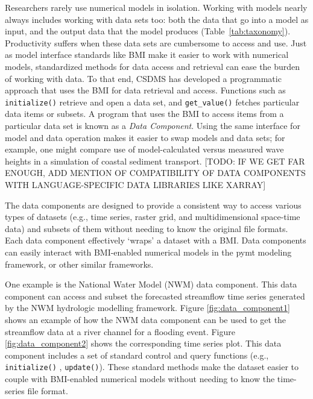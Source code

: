 \documentclass[12pt]{amsart}
\begin{document}
Researchers rarely use numerical models in isolation. Working with models nearly always includes working with data sets too: both the data that go into a model as input, and the output data that the model produces (Table~\ref{tab:taxonomy}). Productivity suffers when these data sets are cumbersome to access and use. Just as model interface standards like BMI make it easier to work with numerical models, standardized methods for data access and retrieval can ease the burden of working with data. To that end, CSDMS has developed a programmatic approach that uses the BMI for data retrieval and access. Functions such as \texttt{initialize()} retrieve and open a data set, and \texttt{get\_value()} fetches particular data items or subsets. A program that uses the BMI to access items from a particular data set is known as a \textit{Data Component}. Using the same interface for model and data operation makes it easier to swap models and data sets; for example, one might compare use of model-calculated versus measured wave heights in a simulation of coastal sediment transport. [TODO: IF WE GET FAR ENOUGH, ADD MENTION OF COMPATIBILITY OF DATA COMPONENTS WITH LANGUAGE-SPECIFIC DATA LIBRARIES LIKE XARRAY]

The data components are designed to provide a consistent way to access various types of datasets (e.g., time series, raster grid, and multidimensional space-time data) and subsets of them without needing to know the original file formats. Each data component effectively `wraps' a dataset with a BMI. Data components can easily interact with BMI-enabled numerical models in the pymt modeling framework, or other similar frameworks.

One example is the National Water Model (NWM) data component. This data component can access and subset the forecasted streamflow time series generated by the NWM hydrologic modelling framework. Figure \ref{fig:data_component1} shows an example of how the NWM data component can be used to get the streamflow data at a river channel for a flooding event. Figure \ref{fig:data_component2} shows the corresponding time series plot. This data component includes a set of standard control and query functions (e.g.,  \texttt{initialize()} , \texttt{update()}). These standard methods make the dataset easier to couple with BMI-enabled numerical models  without needing to know the time-series file format.
\end{document}
